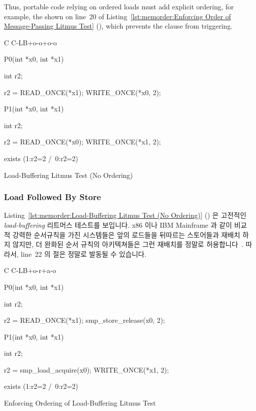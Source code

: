 Thus, portable code relying on ordered loads must
add explicit ordering, for example, the  shown on
line~20 of
Listing~\ref{lst:memorder:Enforcing Order of Message-Passing Litmus Test}
(), which prevents
the  clause from triggering.
\fi

\begin{listing}[tbp]
{ \scriptsize
\begin{verbbox}[\LstLineNo]
C C-LB+o-o+o-o
{
}

P0(int *x0, int *x1)
{
  int r2;

  r2 = READ_ONCE(*x1);
  WRITE_ONCE(*x0, 2);
}


P1(int *x0, int *x1)
{
  int r2;

  r2 = READ_ONCE(*x0);
  WRITE_ONCE(*x1, 2);
}

exists (1:r2=2 /\ 0:r2=2)
\end{verbbox}
}
\centering
\theverbbox
\caption{Load-Buffering Litmus Test (No Ordering)}
\label{lst:memorder:Load-Buffering Litmus Test (No Ordering)}
\end{listing}

\subsubsection{Load Followed By Store}
\label{sec:memorder:Load Followed By Store}

Listing~\ref{lst:memorder:Load-Buffering Litmus Test (No Ordering)}
()
은 고전적인 \emph{load-buffering} 리트머스 테스트를 보입니다.
x86 이나 IBM Mainframe 과 같이 비교적 강력한 순서규칙을 가진 시스템들은 앞의
로드들을 뒤따르는 스토어들과 재배치 하지 않지만, 더 완화된 순서 규칙의
아키텍쳐들은 그런 재배치를 정말로 허용합니다~\cite{JadeAlglave2011ppcmem}.
따라서, line~22 의  절은 정말로 발동될 수 있습니다.

\begin{listing}[tbp]
{ \scriptsize
\begin{verbbox}[\LstLineNo]
C C-LB+o-r+a-o
{
}

P0(int *x0, int *x1)
{
  int r2;

  r2 = READ_ONCE(*x1);
  smp_store_release(x0, 2);
}


P1(int *x0, int *x1)
{
  int r2;

  r2 = smp_load_acquire(x0);
  WRITE_ONCE(*x1, 2);
}

exists (1:r2=2 /\ 0:r2=2)
\end{verbbox}
}
\centering
\theverbbox
\caption{Enforcing Ordering of Load-Buffering Litmus Test}
\label{lst:memorder:Enforcing Ordering of Load-Buffering Litmus Test}
\end{listing}


